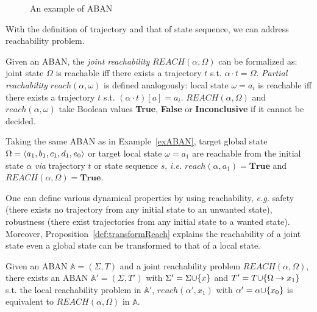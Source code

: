 \begin{figure}[ht]
\centering

\caption[Example of ABAN]{An example of ABAN}\label{fig:exampleABAN}
\end{figure}

With the definition of trajectory and that of state sequence, we can address reachability problem.

\begin{definition}
Given an ABAN, the \textit{joint reachability} $REACH (\alpha,\Omega)$ can be formalized as: joint state $\Omega$ is reachable iff there exists a trajectory $t$ s.t. $\alpha\cdot t=\Omega$.
\textit{Partial reachability} $reach(\alpha,\omega)$ is defined analogously: local state $\omega=a_i$ is reachable iff there exists a trajectory $t$ s.t. $(\alpha\cdot t)[a]=a_i$.
$REACH (\alpha,\Omega)$ and $reach(\alpha,\omega)$ take Boolean values \textbf{True}, \textbf{False} or \textbf{Inconclusive} if it cannot be decided.
\end{definition}

\begin{example}
Taking the same ABAN as in Example~\ref{exABAN}, target global state $\Omega=\langle a_1,b_1,c_1,d_1,e_0\rangle$ or target local state $\omega=a_1$ are reachable from the initial state $\alpha$ \textit{via} trajectory $t$ or state sequence $s$, \textit{i.e.} $reach(\alpha,a_1)=\textbf{True}$ and $REACH(\alpha,\Omega)=\textbf{True}$. 
\end{example}

One can define various dynamical properties by using reachability, \textit{e.g.} safety (there exists no trajectory from any initial state to an unwanted state), robustness (there exist trajectories from any initial state to a wanted state).
Moreover, Proposition~\ref{def:transformReach} explains the reachability of a joint state even a global state can be transformed to that of a local state.

\begin{proposition}\label{def:transformReach}
Given an ABAN $\mathbb{A}=(\Sigma,T)$ and a joint reachability problem $REACH(\alpha,\Omega)$, there exists an ABAN $\mathbb{A}'=(\Sigma,T')$ with $\Sigma'=\Sigma\addset{x}$ and $T'=T\addset{\Omega\to x_1}$ s.t. the local reachability problem in $\mathbb{A}'$, $reach(\alpha', x_1)$ with $\alpha'=\alpha\addset{x_0}$ is equivalent to $REACH(\alpha,\Omega)$ in $\mathbb{A}$.
\end{proposition}

